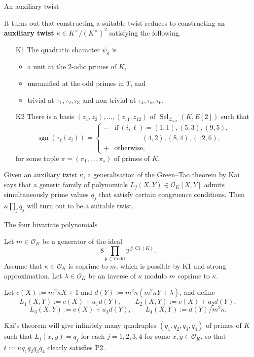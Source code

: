 \documentclass[10pt]{beamer}
\begin{document}
\begin{frame}[t]{An auxiliary twist}

It turns out that constructing a suitable twist reduces to constructing an \textbf{auxiliary twist} $ \kappa \in K^\times / (K^\times)^2 $ satisfying the following.
\begin{itemize}
\item[K1] The quadratic character $ \psi_\kappa $ is
\begin{itemize}
\item a unit at the $ 2 $-adic primes of $ K $,
\item unramified at the odd primes in $ T $, and
\item trivial at $ \tau_1, \tau_2, \tau_3 $ and non-trivial at $ \tau_4, \tau_5, \tau_6 $.
\end{itemize}
\item[K2] There is a basis $ (z_1, z_2), \dots, (z_{11}, z_{12}) $ of $ \operatorname{Sel}_{\mathcal{L}_{s, \pi}}(K, E[2]) $ such that
$$ \operatorname{sgn}(\tau_\ell(z_i)) =
\begin{cases}
- & \text{if} \ (i, \ell) = (1, 1), (5, 3), (9, 5), \\
& \qquad \qquad (4, 2), (8, 4), (12, 6), \\
+ & \text{otherwise},
\end{cases}
$$
for some tuple $ \pi = (\pi_1, \dots, \pi_s) $ of primes of $ K $.
\end{itemize}
Given an auxiliary twist $ \kappa $, a generalisation of the Green--Tao theorem by Kai says that a generic family of polynomials $ L_j(X, Y) \in \mathcal{O}_K[X, Y] $ admits simultaneously prime values $ q_j $ that satisfy certain congruence conditions. Then $ \kappa\prod_j q_j $ will turn out to be a suitable twist.

\end{frame}

\begin{frame}[t]{The four bivariate polynomials}

Let $ m \in \mathcal{O}_K $ be a generator of the ideal
$$ 8\prod_{\mathfrak{p} \in T \ \text{odd}} \mathfrak{p}^{\#\operatorname{Cl}(K)}. $$
Assume that $ \kappa \in \mathcal{O}_K $ is coprime to $ m $, which is possible by K1 and strong approximation. Let $ \lambda \in \mathcal{O}_K $ be an inverse of $ \kappa $ modulo $ m $ coprime to $ \kappa $.

\vspace{0.5cm} Let $ c(X) := m^2\kappa X + 1 $ and $ d(Y) := m^2\kappa(m^2\kappa Y + \lambda) $, and define
$$ L_1(X, Y) := c(X) + a_1d(Y), \qquad L_2(X, Y) := c(X) + a_2d(Y), $$
$$ L_3(X, Y) := c(X) + a_3d(Y), \qquad L_4(X, Y) := d(Y) / m^2\kappa. $$

\vspace{0.5cm} Kai's theorem will give infinitely many quadruples $ (q_1, q_2, q_3, q_4) $ of primes of $ K $ such that $ L_j(x, y) = q_j $ for each $ j = 1, 2, 3, 4 $ for some $ x, y \in \mathcal{O}_K $, so that $ t := \kappa q_1q_2q_3q_4 $ clearly satisfies P2.

\end{frame}
\end{document}
